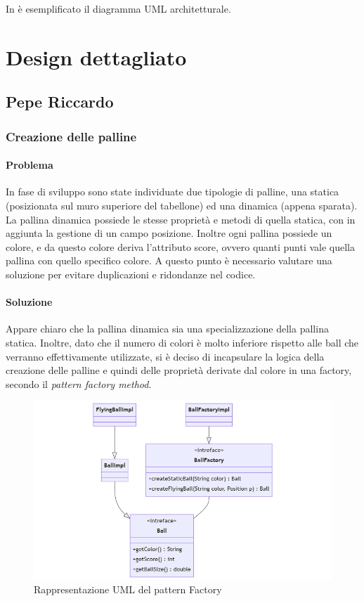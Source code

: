 \documentclass[a4paper,12pt]{report}
\begin{document}
In  è esemplificato il diagramma UML architetturale.

\newpage
\section{Design dettagliato}

\subsection{Pepe Riccardo}

\subsubsection{Creazione delle palline}

\paragraph{Problema} In fase di sviluppo sono state individuate due tipologie di palline, una statica (posizionata sul muro superiore del tabellone) ed una dinamica (appena sparata). La pallina dinamica possiede le stesse proprietà e metodi di quella statica, con in aggiunta la gestione di un campo posizione. Inoltre ogni pallina possiede un colore, e da questo colore deriva l'attributo score, ovvero quanti punti vale quella pallina con quello specifico colore. A questo punto è necessario valutare una soluzione per evitare duplicazioni e ridondanze nel codice.


\paragraph{Soluzione} Appare chiaro che la pallina dinamica sia una specializzazione della pallina statica. Inoltre, dato che il numero di colori è molto inferiore rispetto alle ball che verranno effettivamente utilizzate, si è deciso di incapsulare la logica della creazione delle palline e quindi delle proprietà derivate dal colore in una factory, secondo il \textit{pattern factory method}.

\begin{figure}[H]
\centering{}
\includegraphics[width=\textwidth]{img/Diagramma_UML_Ball}
\caption{Rappresentazione UML del pattern Factory}
\label{img:Diagramma_UML_Ball}
\end{figure}
\end{document}
